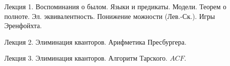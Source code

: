 \begin{enumerate}
    \item[Лекция 1.] Воспоминания о былом. Языки и предикаты. Модели. Теорем о полноте.
        Эл. эквивалентность. Понижение можности (Лев.-Ск.). Игры Эренфойхта.
    \item[Лекция 2.] Элиминация кванторов. Арифметика Пресбургера.
    \item[Лекция 3.] Элиминация кванторов. Алгоритм Тарского. $ACF$.
\end{enumerate}